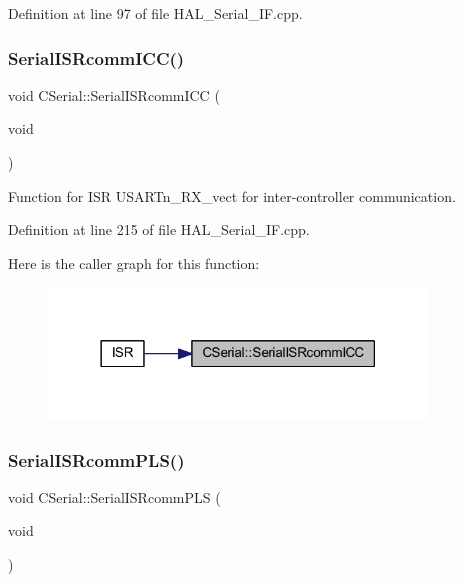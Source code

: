 Definition at line 97 of file H\+A\+L\+\_\+\+Serial\+\_\+\+I\+F.\+cpp.

\mbox{\label{class_c_serial_a974812db5ced18cb9a6a73dc9034e7c8}} 
\subsubsection{\texorpdfstring{SerialISRcommICC()}{SerialISRcommICC()}}
{\footnotesize\ttfamily void C\+Serial\+::\+Serial\+I\+S\+Rcomm\+I\+CC (\begin{DoxyParamCaption}\item[{void}]{ }\end{DoxyParamCaption})}



Function for I\+SR U\+S\+A\+R\+Tn\+\_\+\+R\+X\+\_\+vect for inter-\/controller communication. 



Definition at line 215 of file H\+A\+L\+\_\+\+Serial\+\_\+\+I\+F.\+cpp.

Here is the caller graph for this function\+:
\nopagebreak
\begin{figure}[H]
\begin{center}
\leavevmode
\includegraphics[width=285pt]{class_c_serial_a974812db5ced18cb9a6a73dc9034e7c8_icgraph}
\end{center}
\end{figure}
\mbox{\label{class_c_serial_a707841754d94fc1ab6679f52bf413d85}} 
\subsubsection{\texorpdfstring{SerialISRcommPLS()}{SerialISRcommPLS()}}
{\footnotesize\ttfamily void C\+Serial\+::\+Serial\+I\+S\+Rcomm\+P\+LS (\begin{DoxyParamCaption}\item[{void}]{ }\end{DoxyParamCaption})}



